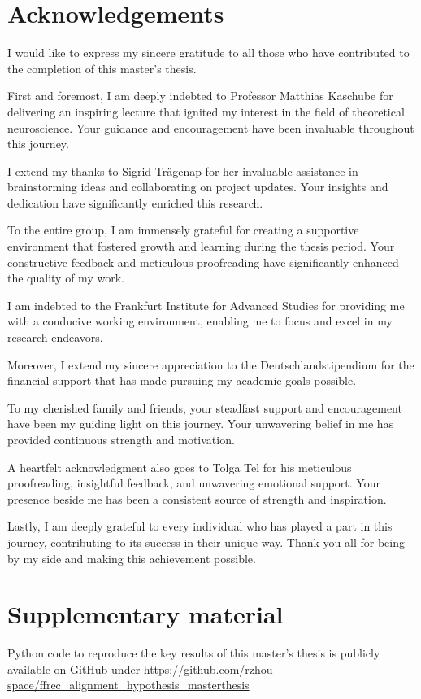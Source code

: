 \documentclass[11pt]{article}
\begin{document}
	\section*{Acknowledgements}
	
	I would like to express my sincere gratitude to all those who have contributed to the completion of this master's thesis.
	
	First and foremost, I am deeply indebted to Professor Matthias Kaschube for delivering an inspiring lecture that ignited my interest in the field of theoretical neuroscience. Your guidance and encouragement have been invaluable throughout this journey.
	
	I extend my thanks to Sigrid Trägenap for her invaluable assistance in brainstorming ideas and collaborating on project updates. Your insights and dedication have significantly enriched this research.
	
	To the entire group, I am immensely grateful for creating a supportive environment that fostered growth and learning during the thesis period. Your constructive feedback and meticulous proofreading have significantly enhanced the quality of my work.
	
	I am indebted to the Frankfurt Institute for Advanced Studies for providing me with a conducive working environment, enabling me to focus and excel in my research endeavors. 
	
	Moreover, I extend my sincere appreciation to the Deutschlandstipendium for the financial support that has made pursuing my academic goals possible.
	
	To my cherished family and friends, your steadfast support and encouragement have been my guiding light on this journey. Your unwavering belief in me has provided continuous strength and motivation. 
	
	A heartfelt acknowledgment also goes to Tolga Tel for his meticulous proofreading, insightful feedback, and unwavering emotional support. Your presence beside me has been a consistent source of strength and inspiration.
	
	Lastly, I am deeply grateful to every individual who has played a part in this journey, contributing to its success in their unique way. Thank you all for being by my side and making this achievement possible.
	
	\section*{Supplementary material}
	
	Python code to reproduce the key results of this master's thesis is publicly available on GitHub under \url{https://github.com/rzhou-space/ffrec_alignment_hypothesis_masterthesis}
	
\end{document}
